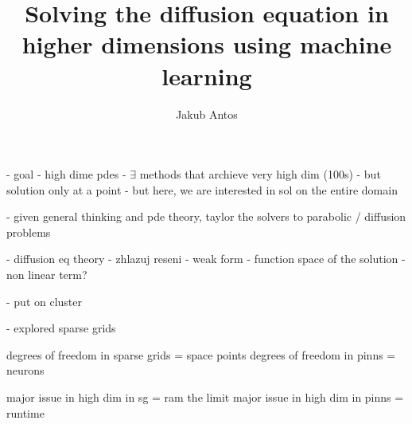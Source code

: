 \documentclass{beamer}
\title{Solving the diffusion equation in higher dimensions using machine learning}
\author{Jakub Antos}
\institute{supervisor: Michal Pavelka}
\begin{document}

\frame{\titlepage}


\begin{frame}

- goal
    - high dime pdes
        - $\exists$ methods that archieve very high dim (100s)
            - but solution only at a point
        - but here, we are interested in sol on the entire domain


- given general thinking and pde theory,
  taylor the solvers to parabolic / diffusion problems


- diffusion eq theory
    - zhlazuj reseni
    - weak form
    - function space of the solution
    - non linear term?

- put on cluster

- explored sparse grids


degrees of freedom in sparse grids = space points
degrees of freedom in pinns = neurons

major issue in high dim in sg = ram the limit
major issue in high dim in pinns = runtime





\end{frame}
\end{document}
